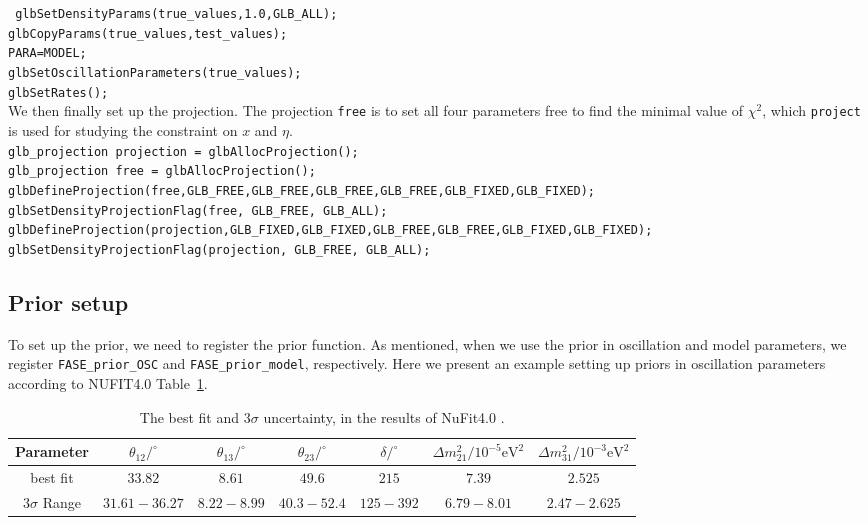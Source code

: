 \documentclass[aps,prd,nofootinbib,preprint]{revtex4}
\begin{document}
\texttt{    glbSetDensityParams(true\_values,1.0,GLB\_ALL);}\\
\texttt{glbCopyParams(true\_values,test\_values);}\\
\texttt{PARA=MODEL;\\
    glbSetOscillationParameters(true\_values);\\
    glbSetRates();}\vspace{0.2cm}\\
We then finally set up the projection. The projection \texttt{free} is to set all four parameters free to find the minimal value of $\chi^2$, which \texttt{project} is used for studying the constraint on $x$ and $\eta$.\vspace{0.2cm}\\  
\texttt{glb\_projection projection = glbAllocProjection();\\
    glb\_projection free = glbAllocProjection();  \\
     glbDefineProjection(free,GLB\_FREE,GLB\_FREE,GLB\_FREE,GLB\_FREE,GLB\_FIXED,GLB\_FIXED);\\
    glbSetDensityProjectionFlag(free, GLB\_FREE, GLB\_ALL);\\
glbDefineProjection(projection,GLB\_FIXED,GLB\_FIXED,GLB\_FREE,GLB\_FREE,GLB\_FIXED,GLB\_FIXED);\\    
glbSetDensityProjectionFlag(projection, GLB\_FREE, GLB\_ALL);\\
    }
    
\subsection{Prior setup} 

To set up the prior, we need to register the prior function. As mentioned, when we use the prior in oscillation and model parameters, we register \texttt{FASE\_prior\_OSC} and \texttt{FASE\_prior\_model}, respectively. Here we present an example setting up priors in oscillation parameters according to NUFIT4.0 Table~\ref{tab:nufit4.0}.

\begin{table}[!h]
\caption{The best fit and $3\sigma$ uncertainty, in the results of NuFit4.0 \cite{Esteban:2018azc}.}
\begin{tabular}{|c|c|c|c|c|c|c|}
\hline
Parameter & $\theta_{12}/^\circ$ & $\theta_{13}/^\circ$ & $\theta_{23}/^\circ$ & $\delta/^\circ$  & $\Delta m_{21}^2/10^{-5}\text{eV}^2$ & $\Delta m_{31}^2/10^{-3}\text{eV}^2$\\ \hline\hline
best fit & $33.82$ & $8.61$ & $49.6$ & $215$ & $7.39$ & $2.525$ \\\hline
$3\sigma$ Range & $31.61-36.27$ & $8.22-8.99$ & $40.3-52.4$ & $125-392$ & $6.79-8.01$ & $2.47-2.625$ \\\hline
\end{tabular}
\label{tab:nufit4.0}
\end{table}
\end{document}
